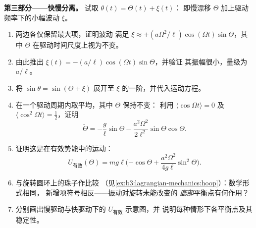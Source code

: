 \begin{problem}
\medskip\noindent\textbf{第三部分——快慢分离。}
试取 $\theta(t) = \Theta(t) + \xi(t)$：
即慢漂移 $\Theta$ 加上驱动频率下的小幅波动 $\xi$。
\begin{enumerate}[resume]
  \item 两边各仅保留最大项，证明波动
        满足 $\ddot\xi \approx +(a\Omega^2/\ell)\cos(\Omega t)
        \sin\Theta$，其中 $\Theta$ 在驱动时间尺度上视为不变。
  \item 由此推出 $\xi(t) = -(a/\ell)\cos(\Omega t)\sin\Theta$，并验证
        其振幅很小，量级为 $a/\ell$。
  \item 将 $\sin\theta = \sin(\Theta + \xi)$ 展开至
        $\xi$ 的一阶，并代入运动方程。
  \item 在一个驱动周期内取平均，其中 $\Theta$ 保持不变：
        利用 $\langle\cos\Omega t\rangle = 0$ 及
        $\langle\cos^2\Omega t\rangle = \tfrac12$，证明
        \[
        \ddot\Theta = -\frac{g}{\ell}\sin\Theta
         - \frac{a^2\Omega^2}{2\ell^2}\sin\Theta\cos\Theta .
        \]
  \item 证明这是在有效势能中的运动：
        \[
        U_{\text{有效}}(\Theta) = mg\ell\Big({-\cos\Theta}
         + \frac{a^2\Omega^2}{4g\ell}\sin^2\Theta\Big) .
        \]
  \item 与旋转圆环上的珠子作比较
        （见\cref{ex:b3:lagrangian-mechanics:hoop}）：数学形式相同，
        新增项符号相反——振动对旋转未能改变的
        \emph{底部}平衡点有何作用？
  \item 分别画出慢驱动与快驱动下的 $U_{\text{有效}}$ 示意图，并
        说明每种情形下各平衡点及其稳定性。
\end{enumerate}


\end{problem}
